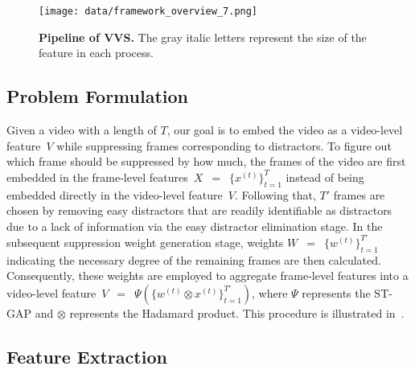 \documentclass[10pt,twocolumn,letterpaper]{article}
\begin{document}
    \begin{figure}[t!]
        \centering
        \texttt{[image: data/framework\_overview\_7.png]} 
        \vspace{-3mm}
        \caption{\textbf{Pipeline of VVS.} The gray italic letters represent the size of the feature in each process.  \vspace{-3mm}} \label{fig:fig2}
    \end{figure}
    
    \subsection{Problem Formulation}
        Given a video with a length of $T$, our goal is to embed the video as a video-level feature~$V$ while suppressing frames corresponding to distractors. To figure out which frame should be suppressed by how much, the frames of the video are first embedded in the frame-level features~$X$~$=$~$\{ x^{(t)} \}_{t=1}^{T}$ instead of being embedded directly in the video-level feature~$V$. Following that, $T'$ frames are chosen by removing easy distractors that are readily identifiable as distractors due to a lack of information via the easy distractor elimination stage. In the subsequent suppression weight generation stage, weights $W$~$=$~$\{ w^{(t)} \}_{t=1}^{T'}$ indicating the necessary degree of the remaining frames are then calculated. Consequently, these weights are employed to aggregate frame-level features into a video-level feature~$V$~$=$~$\Psi(\{w^{(t)}\otimes x^{(t)}\}_{t=1}^{T'})$, where $\Psi$ represents the ST-GAP and $\otimes$ represents the Hadamard product. This procedure is illustrated in~.

    
    \subsection{Feature Extraction}
\end{document}
